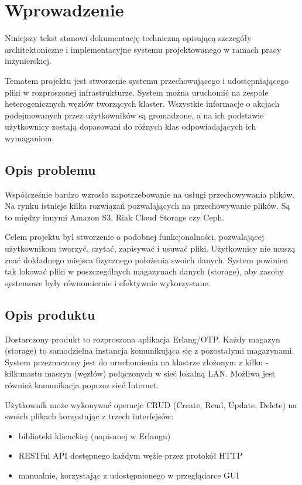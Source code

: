 \section{Wprowadzenie}
Niniejszy tekst stanowi dokumentację techniczną opisującą szczegóły architektoniczne i implementacyjne systemu projektowanego w ramach pracy inżynierskiej.

Tematem projektu jest stworzenie systemu przechowującego i udostępniającego pliki w rozproszonej infrastrukturze. System można uruchomić na zespole heterogenicznych węzłów tworzących klaster. Wszystkie informacje o akcjach podejmowanych przez użytkowników są gromadzone, a na ich podstawie użytkownicy zostają dopasowani do różnych klas odpowiadających ich wymaganiom.

\subsection{Opis problemu}
Współcześnie bardzo wzrosło zapotrzebowanie na usługi przechowywania plików. Na rynku istnieje kilka rozwiązań pozwalających na przechowywanie plików. Są to między innymi Amazon S3, Riak Cloud Storage czy Ceph.

Celem projektu był stworzenie o podobnej funkcjonalności, pozwalającej użytkownikom tworzyć, czytać, zapisywać i usuwać pliki. Użytkownicy nie muszą znać dokładnego miejsca fizycznego położenia swoich danych. System powinien tak lokować pliki w poszczególnych magazynach danych (storage), aby zasoby systemowe były równomiernie i efektywnie wykorzystane.

\subsection{Opis produktu}
Dostarczony produkt to rozproszona aplikacja Erlang/OTP. Każdy magazyn (storage) to samodzielna instancja komunikująca się z pozostałymi magazynami. System przeznaczony jest do uruchomienia na klastrze złożonym z kilku - kilkunastu maszyn (węzłów) połączonych w sieć lokalną LAN. Możliwa jest również komunikacja poprzez sieć Internet.

Użytkownik może wykonywać operacje CRUD (Create, Read, Update, Delete) na swoich plikach korzystając z trzech interfejsów:
\begin{itemize}
	\item biblioteki klienckiej (napisanej w Erlangu)
	\item RESTful API dostępnego każdym węźle przez protokół HTTP
	\item manualnie, korzystając z udostępnionego w przeglądarce GUI
\end{itemize}

